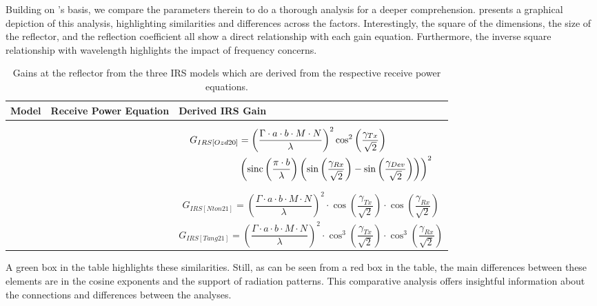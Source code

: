 Building on 's basis, we compare the parameters therein to do a thorough analysis for a deeper comprehension.  presents a graphical depiction of this analysis, highlighting similarities and differences across the factors. Interestingly, the square of the dimensions, the size of the reflector, and the reflection coefficient all show a direct relationship with each gain equation. Furthermore, the inverse square relationship with wavelength highlights the impact of frequency concerns.
\begin{table}[H] %
	\caption{Gains at the reflector from the three IRS models \cite{8936989,ntontin2021optimal,tang2020wireless} which are derived from the respective receive power equations.}
	\footnotesize
	\label{Gain at IRS}
	\centering
	\begin{tabular}{C{1cm}|C{2.5cm}|C{10cm}}
		\textbf{Model} & \bf Receive Power Equation & \bf Derived IRS Gain \\
		\hline 
		\cite{8936989} &   & 
		\begin{equation} \label{Eq:model1 IRS gain} 
			\begin{aligned}
				G_{IRS[Ozd20]} &= \left( \frac{\Gamma \cdot a \cdot b \cdot M \cdot N}{\lambda} \right) ^2 \cos^2 \left( {\frac{\gamma_{Tx}}{\sqrt{2}}} \right)	\\
				& \left( \operatorname{sinc} \left( \frac{\pi \cdot b}{\lambda} \right) \left( \sin \left( {\frac{\gamma_{Rx}}{\sqrt2}} \right) - \sin \left( {\frac{\gamma_{Dev}}{\sqrt2}} \right) \right) \right)^2
			\end{aligned}
		\end{equation}\\
		\hline 
		\cite{ntontin2021optimal} &   & \begin{equation}
			\label{Eq:model2 IRS gain}
			G_{IRS[Nton21]} = \left( \frac{\Gamma \cdot a\cdot b \cdot M \cdot N}{\lambda} \right)^2 \cdot \cos \left(\frac{\gamma_{Tx}}{\sqrt{2}} \right) \cdot \cos \left( \frac{\gamma_{Rx}}{\sqrt{2}} \right)
		\end{equation}\\
		\hline 
		\cite{tang2020wireless} &   & \begin{equation}
			\label{Eq:model3 IRS gain}
			G_{IRS[Tang21]} =\left( \frac{\Gamma \cdot a\cdot b \cdot M \cdot N}{\lambda} \right)^2 \cdot \cos^3 \left( \frac{\gamma_{Tx}}{\sqrt{2}} \right) \cdot \cos^3 \left( \frac{\gamma_{Rx}}{\sqrt{2}} \right)
		\end{equation}
	\end{tabular}
\end{table}
A green box in the table highlights these similarities. Still, as can be seen from a red box in the table, the main differences between these elements are in the cosine exponents and the support of radiation patterns. This comparative analysis offers insightful information about the connections and differences between the analyses.

